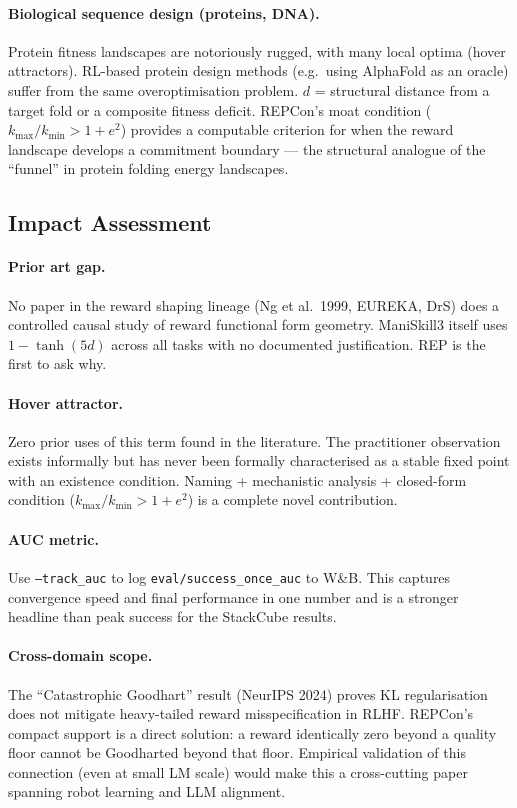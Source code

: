 \documentclass{article}
\begin{document}
\paragraph{Biological sequence design (proteins, DNA).}
Protein fitness landscapes are notoriously rugged, with many local optima (hover
attractors). RL-based protein design methods (e.g.\ using AlphaFold as an oracle)
suffer from the same overoptimisation problem. $d$ = structural distance from a
target fold or a composite fitness deficit. REPCon's moat condition
($k_{\max}/k_{\min} > 1+e^2$) provides a computable criterion for when the reward
landscape develops a commitment boundary --- the structural analogue of the
``funnel'' in protein folding energy landscapes.

\subsection{Impact Assessment}
\label{app:impact}

\paragraph{Prior art gap.}
No paper in the reward shaping lineage (Ng et al.\ 1999, EUREKA, DrS) does a controlled
causal study of reward functional form geometry. ManiSkill3 itself uses $1 - \tanh(5d)$
across all tasks with no documented justification. REP is the first to ask why.

\paragraph{Hover attractor.}
Zero prior uses of this term found in the literature. The practitioner observation exists
informally but has never been formally characterised as a stable fixed point with an
existence condition. Naming + mechanistic analysis + closed-form condition
($k_{\max}/k_{\min} > 1 + e^2$) is a complete novel contribution.

\paragraph{AUC metric.}
Use \texttt{--track\_auc} to log \texttt{eval/success\_once\_auc} to W\&B. This captures
convergence speed and final performance in one number and is a stronger headline than
peak success for the StackCube results.

\paragraph{Cross-domain scope.}
The ``Catastrophic Goodhart'' result (NeurIPS 2024) proves KL regularisation does not
mitigate heavy-tailed reward misspecification in RLHF. REPCon's compact support is a
direct solution: a reward identically zero beyond a quality floor cannot be Goodharted
beyond that floor. Empirical validation of this connection (even at small LM scale) would
make this a cross-cutting paper spanning robot learning and LLM alignment.
\end{document}
